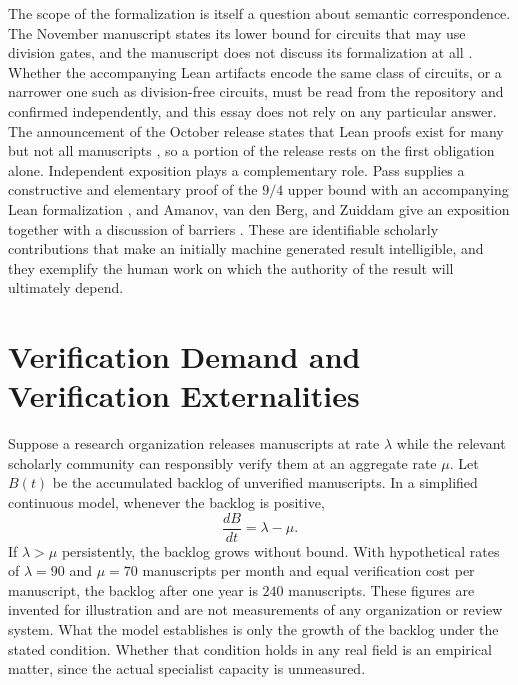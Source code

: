 \documentclass[12pt]{article}
\begin{document}
The scope of the formalization is itself a question about semantic correspondence. The November manuscript states its lower bound for circuits that may use division gates, and the manuscript does not discuss its formalization at all \cite{openai-nine-fourths}. Whether the accompanying Lean artifacts encode the same class of circuits, or a narrower one such as division-free circuits, must be read from the repository and confirmed independently, and this essay does not rely on any particular answer. The announcement of the October release states that Lean proofs exist for many but not all manuscripts \cite{openai-first-look}, so a portion of the release rests on the first obligation alone. Independent exposition plays a complementary role. Pass supplies a constructive and elementary proof of the $9/4$ upper bound with an accompanying Lean formalization \cite{pass-polynomial-packings}, and Amanov, van den Berg, and Zuiddam give an exposition together with a discussion of barriers \cite{amanov-exposition}. These are identifiable scholarly contributions that make an initially machine generated result intelligible, and they exemplify the human work on which the authority of the result will ultimately depend.

\section{Verification Demand and Verification Externalities}

Suppose a research organization releases manuscripts at rate $\lambda$ while the relevant scholarly community can responsibly verify them at an aggregate rate $\mu$. Let $B(t)$ be the accumulated backlog of unverified manuscripts. In a simplified continuous model, whenever the backlog is positive,
\begin{equation}
\frac{dB}{dt} = \lambda - \mu .
\end{equation}
If $\lambda > \mu$ persistently, the backlog grows without bound. With hypothetical rates of $\lambda = 90$ and $\mu = 70$ manuscripts per month and equal verification cost per manuscript, the backlog after one year is $240$ manuscripts. These figures are invented for illustration and are not measurements of any organization or review system. What the model establishes is only the growth of the backlog under the stated condition. Whether that condition holds in any real field is an empirical matter, since the actual specialist capacity is unmeasured.
\end{document}
